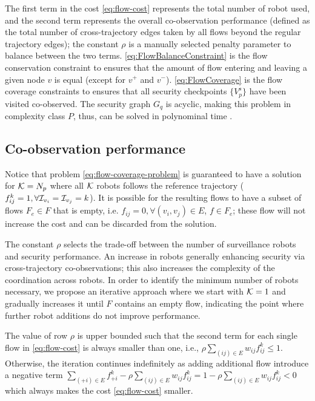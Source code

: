 \documentclass[10pt,twocolumn,twoside]{IEEEtran}
\begin{document}
The first term in the cost \eqref{eq:flow-cost} represents the total number of robot used, and the second term represents the overall co-observation performance (defined as the total number of cross-trajectory edges taken by all flows beyond the regular trajectory edges); the constant $\rho$ is a manually selected penalty parameter to balance between the two terms. \eqref{eq:FlowBalanceConstraint} is the flow conservation constraint to ensures that the amount of flow entering and leaving a given node $v$ is equal (except for $v^{+}$ and $v^{-}$). \eqref{eq:FlowCoverage} is the flow coverage constraints to ensures that all security checkpoints $ \{V^{s}_{p}\}$ have been visited co-observed. The security graph $G_{q}$ is acyclic, making this problem in complexity class $P$, thus, can be solved in polynominal time \cite{1702662}. 

\subsection{Co-observation performance}
Notice that problem \eqref{eq:flow-coverage-problem} is guaranteed to have a solution for $\mathcal{K}=N_{p}$ where all $\mathcal{K}$ robots follows the reference trajectory ($f^{k}_{ij}=1, \forall \mathcal{I}_{v_{i}}=\mathcal{I}_{v_{j}}=k$).  %
It is possible for the resulting flows to have a subset of flows $F_{e} \in F$ that is empty, i.e. $f_{ij}=0, \forall (v_{i},v_{j})\in E$, $f\in F_{e}$; these flow will not increase the cost and can be discarded from the solution.  

The constant $\rho$ selects the trade-off between the number of surveillance robots and security performance. An increase in robots generally enhancing security via cross-trajectory co-observations; this also increases the complexity of the coordination across robots. In order to identify the minimum number of robots necessary, we propose an iterative approach where we start with $\mathcal{K}=1$ and gradually increases it until $F$ contains an empty flow, indicating the point where further robot additions do not improve performance. 

\begin{remark} 
The value of row $\rho$ is upper bounded such that the second term for each single flow in \eqref{eq:flow-cost} is always smaller than one, i.e., $ \rho \sum_{(ij)\in E} w_{ij} f^k_{ij}\leq 1$. Otherwise, the iteration continues indefinitely as adding additional flow introduce a negative term $\sum_{(+i)\in E} f^{k}_{+i} - \rho\sum_{(ij)\in E} w_{ij} f^k_{ij} = 1- \rho\sum_{(ij)\in E} w_{ij} f^k_{ij}<0$ which always makes the cost \eqref{eq:flow-cost} smaller.
\end{remark}
\end{document}
